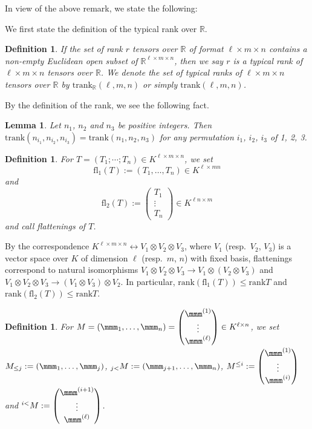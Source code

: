 \documentclass[a4paper,12pt]{article}
\newcommand{\RRR}{\mathbb{R}}
\newcommand{\define}{\mathrel{:=}}
\newcommand{\rank}{\mathrm{rank}}
\newcommand{\trank}{{\mathrm{trank}}}
\newcommand\fl{\mathrm{fl}}
\newtheorem{lemma}[thm]{Lemma}
\newtheorem{definition}[thm]{Definition}
\begin{document}
In view of the above remark, we state the following:
\fi

We first state the definition of the typical rank over $\RRR$.

\begin{definition}\rm
If the set of rank $r$ tensors over $\RRR$ of format $\ell\times m\times n$
contains a non-empty Euclidean open subset of $\RRR^{\ell\times m\times n}$,
then we say $r$ is a typical rank of $\ell\times m\times n$ tensors over $\RRR$.
We denote the set of typical ranks of $\ell\times m\times n$ tensors over
$\RRR$ by $\trank_\RRR(\ell,m,n)$ or simply $\trank(\ell,m,n)$.
\end{definition}

By the definition of the rank, we see the following fact.

\begin{lemma}
Let $n_1$, $n_2$ and $n_3$ be positive integers.
Then
$\trank(n_{i_1},n_{i_2},n_{i_3})=\trank(n_1,n_2,n_3)$
for any permutation $i_1$, $i_2$, $i_3$ of  1, 2, 3.
\end{lemma}


\begin{definition}\rm
For $T=(T_1;\cdots;T_n)\in K^{\ell\times m\times n}$, we set
$$
\fl_1(T)\define(T_1,\ldots, T_n)\in K^{\ell\times mn}
$$
and
$$
\fl_2(T)\define
\begin{pmatrix}T_1\\\vdots\\T_n\end{pmatrix}\in K^{\ell n\times m}
$$
and call flattenings of $T$.
\end{definition}
%
%
By the correspondence $K^{\ell\times m\times n}\leftrightarrow
V_1\otimes V_2\otimes V_3$, where $V_1$ (resp.\ $V_2$, $V_3$)
is a vector space over $K$ of dimension $\ell$ (resp.\ $m$, $n$)
with fixed basis,
flattenings correspond to natural isomorphisms
$V_1\otimes V_2\otimes V_3\to V_1\otimes (V_2\otimes V_3)$
and 
$V_1\otimes V_2\otimes V_3\to(V_1\otimes V_3)\otimes V_2$.
In particular,
$\rank (\fl_1(T))\leq \rank T$ and $\rank(\fl_2(T))\leq\rank T$.


\begin{definition}\rm
For $M=(\mmm_1,\ldots,\mmm_n)=
\begin{pmatrix}\mmm^{(1)}\\\vdots\\\mmm^{(\ell)}\end{pmatrix}
\in K^{\ell\times n}$,
we set
$M_{\leq j}\define(\mmm_1,\ldots, \mmm_{j})$,
${}_{j<}M\define(\mmm_{j+1},\ldots, \mmm_{n})$,
$M^{\leq i}\define\begin{pmatrix}\mmm^{(1)}\\\vdots\\\mmm^{(i)}\end{pmatrix}$
and
${}^{i<}M\define\begin{pmatrix}\mmm^{(i+1)}\\\vdots\\\mmm^{(\ell)}\end{pmatrix}$.
\end{definition}
\end{document}
